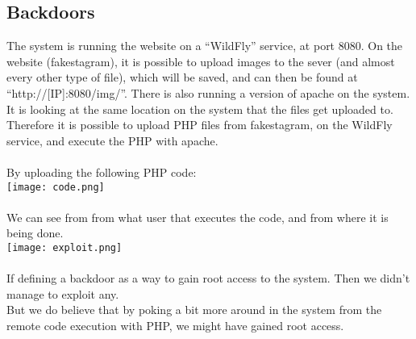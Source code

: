 \subsection{Backdoors}


The system is running the website on a “WildFly” service, at port 8080. On the website (fakestagram), it is possible to upload images to the sever (and almost every other type of file), which will be saved, and can then be found at “http://[IP]:8080/img/”. There is also running a version of apache on the system. It is looking at the same location on the system that the files get uploaded to. \\
Therefore it is possible to upload PHP files from fakestagram, on the WildFly service, and execute the PHP with apache. \\ \\
By uploading the following PHP code:\\
\texttt{[image: code.png]} \\ \\
We can see from from what user that executes the code, and from where it is being done. \\
\texttt{[image: exploit.png]} \\ \\
If defining a backdoor as a way to gain root access to the system. Then we didn't manage to exploit any. \\
But we do believe that by poking a bit more around in the system from the remote code execution with PHP, we might have gained root access.